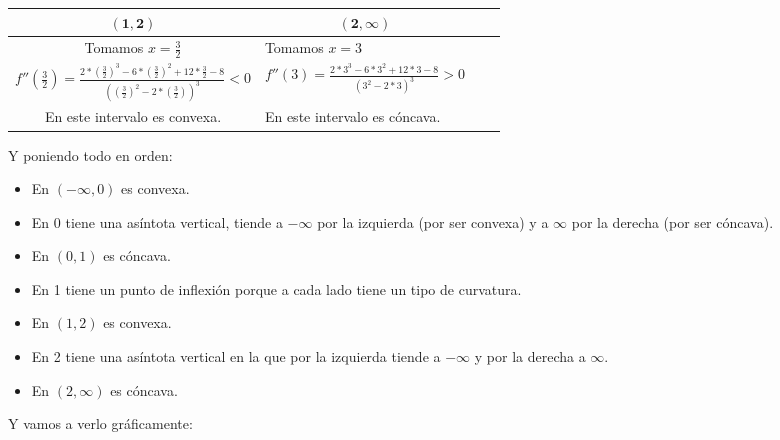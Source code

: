 \documentclass[a4paper,11pt,answers]{exam}
\newcommand\ddfrac[2]{\frac{\displaystyle #1}{\displaystyle #2}}
\begin{document}
\begin{questions}
\begin{solution}
\begin{footnotesize}
\begin{center}
\begin{tabular}{|Sl|Sl|}
\hline
{}                                                                                  & \\
\hline
 Tomamos $x=\frac{3}{2}$& Tomamos $x=3$                                  \\
 $f''\left(\frac{3}{2}\right) =\ddfrac{2*\left(\frac{3}{2}\right)^3 - 6*\left(\frac{3}{2}\right)^2+12*\frac{3}{2} - 8}
{\left(\left(\frac{3}{2}\right)^2 - 2*\left(\frac{3}{2}\right)\right)^3} < 0$ &
$f''(3) =\frac{2*3^3 - 6*3^2+12*3 - 8}{(3^2 - 2*3)^3}>0$\\
  En este intervalo es convexa.& En este intervalo es cóncava.\\
  \hline
\end{tabular}
\end{center}
\end{footnotesize}

Y poniendo todo en orden:
\begin{itemize}
	\item En $(-\infty, 0)$ es convexa.
	\item En 0 tiene una asíntota vertical, tiende a $-\infty$ por la izquierda (por ser convexa) y a $\infty$ por la derecha (por ser cóncava).
	\item En $(0, 1)$ es cóncava.
	\item En 1 tiene un punto de inflexión porque a cada lado tiene un tipo de curvatura.
	\item En $(1, 2)$ es convexa.
	\item En 2 tiene una asíntota vertical en la que por la izquierda tiende a $-\infty$ y por la derecha a $\infty$.
	\item En $(2, \infty)$ es cóncava.
\end{itemize}

Y vamos a verlo gráficamente:
\begin{center}
\end{center}
\end{solution}


\end{questions}
\end{document}
